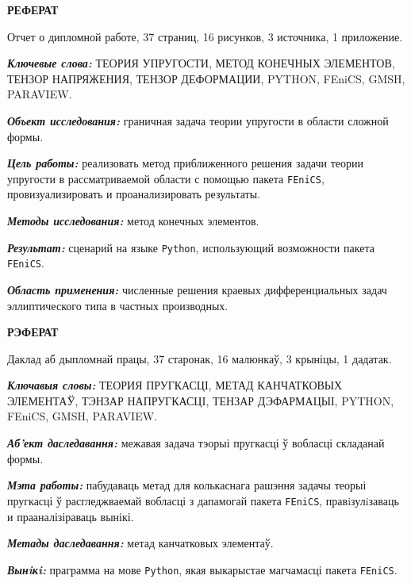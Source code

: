 \documentclass[a4paper, 14pt]{extreport}
\begin{document}
\tableofcontents



\newpage
{}
\begin{center}
	\Large{\textbf{РЕФЕРАТ}}
\end{center}

Отчет о дипломной работе, 37 страниц, 16 рисунков, 3 источника, 1 приложение.

\textbf{\textit{Ключевые слова:}} ТЕОРИЯ УПРУГОСТИ, МЕТОД КОНЕЧНЫХ 
ЭЛЕМЕНТОВ, ТЕНЗОР НАПРЯЖЕНИЯ, ТЕНЗОР ДЕФОРМАЦИИ, PYTHON, FEniCS, 
GMSH, PARAVIEW.

\textbf{\textit{Объект исследования:}} граничная задача теории 
упругости в области сложной формы.

\textbf{\textit{Цель работы:}} реализовать метод приближенного решения
задачи теории упругости в рассматриваемой области с помощью пакета
\texttt{FEniCS}, провизуализировать и проанализировать результаты.

\textbf{\textit{Методы исследования:}} метод конечных элементов.

\textbf{\textit{Результат:}} сценарий на языке \texttt{Python},
использующий возможности пакета \texttt{FEniCS}.

\textbf{\textit{Область применения:}} численные решения краевых 
дифференциальных задач эллиптического типа в частных производных.

\begin{center}
	\Large{\textbf{РЭФЕРАТ}}
\end{center}

Даклад аб дыпломнай працы, 37 старонак, 16 малюнкаў, 3 крыніцы, 1 дадатак.

\textbf{\textit{Ключавыя словы:}} ТЕОРИЯ ПРУГКАСЦІ, МЕТАД КАНЧАТКОВЫХ \\
ЭЛЕМЕНТАЎ, ТЭНЗАР НАПРУГКАСЦI, ТЕНЗАР ДЭФАРМАЦЫІ, PYTHON, \\ FEniCS, 
GMSH, PARAVIEW.

\textbf{\textit{Аб'ект даследавання:}} межавая задача тэорыі 
пругкасці ў вобласці складанай формы.

\textbf{\textit{Мэта работы:}} пабудаваць метад для колькаснага 
рашэння задачы теорыі пругкасці ў расгледжваемай вобласці з
дапамогай пакета \texttt{FEniCS}, правiзулiзаваць и прааналізіраваць вынікі.

\textbf{\textit{Метады даследавання:}} метад канчатковых элементаў.

\textbf{\textit{Вынiкi:}} праграмма на мове \texttt{Python},
якая выкарыстае магчамасці пакета \texttt{FEniCS}.
\end{document}
